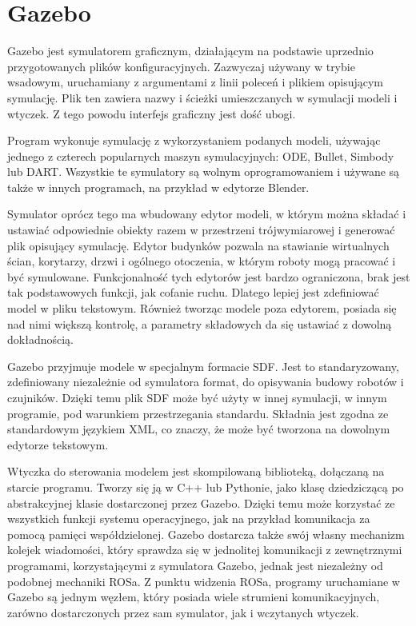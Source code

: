 \section{Gazebo}
	Gazebo \cite{gazebo_website} jest symulatorem graficznym, działającym na podstawie uprzednio przygotowanych plików konfiguracyjnych.
	Zazwyczaj używany w trybie wsadowym, uruchamiany z argumentami z linii poleceń i plikiem opisującym symulację.
	Plik ten zawiera nazwy i ścieżki umieszczanych w symulacji modeli i wtyczek.
	Z tego powodu interfejs graficzny jest dość ubogi.

	Program wykonuje symulację z wykorzystaniem podanych modeli, używając jednego z czterech popularnych maszyn symulacyjnych: ODE, Bullet, Simbody lub DART.
	Wszystkie te symulatory są wolnym oprogramowaniem i używane są także w innych programach, na przykład w edytorze Blender.

	Symulator oprócz tego ma wbudowany edytor modeli, w którym można składać i ustawiać odpowiednie obiekty razem w przestrzeni trójwymiarowej
	i generować plik opisujący symulację.
	Edytor budynków pozwala na stawianie wirtualnych ścian, korytarzy, drzwi i ogólnego otoczenia, w którym roboty mogą pracować i być symulowane.
	Funkcjonalność tych edytorów jest bardzo ograniczona, brak jest tak podstawowych funkcji, jak cofanie ruchu.
	Dlatego lepiej jest zdefiniować model w pliku tekstowym.
	Również tworząc modele poza edytorem, posiada się nad nimi większą kontrolę, a parametry składowych da się ustawiać z dowolną dokładnością.

	Gazebo przyjmuje modele w specjalnym formacie SDF. Jest to standaryzowany, zdefiniowany niezależnie od symulatora format, do opisywania budowy robotów i czujników.
	Dzięki temu plik SDF może być użyty w innej symulacji, w innym programie, pod warunkiem przestrzegania standardu.
	Składnia jest zgodna ze standardowym językiem XML, co znaczy, że może być tworzona na dowolnym edytorze tekstowym.

	Wtyczka do sterowania modelem jest skompilowaną biblioteką, dołączaną na starcie programu.
	Tworzy się ją w C++ lub Pythonie, jako klasę dziedziczącą po abstrakcyjnej klasie dostarczonej przez Gazebo.
	Dzięki temu może korzystać ze wszystkich funkcji systemu operacyjnego, jak na przykład komunikacja za pomocą pamięci współdzielonej.
	Gazebo dostarcza także swój własny mechanizm kolejek wiadomości, który sprawdza się w jednolitej komunikacji z zewnętrznymi programami, korzystającymi z symulatora Gazebo, jednak jest niezależny od podobnej mechaniki ROSa. Z punktu widzenia ROSa, programy uruchamiane w Gazebo są jednym węzłem, który posiada wiele strumieni komunikacyjnych,
	zarówno dostarczonych przez sam symulator, jak i wczytanych wtyczek.

